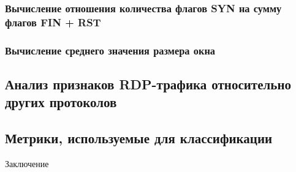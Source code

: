 \documentclass[bachelor, och, coursework]{SCWorks}
\begin{document}
\subsubsection{Вычисление отношения количества флагов SYN на сумму флагов FIN + RST}
\subsubsection{Вычисление среднего значения размера окна}



\subsection{Анализ признаков RDP-трафика относительно других протоколов}

\subsection{Метрики, используемые для классификации}


\conclusion
  
Заключение
\end{document}
